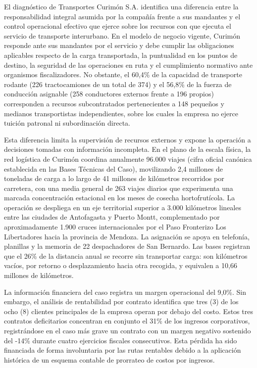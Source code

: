 El diagnóstico de Transportes Curimón S.A. identifica una diferencia entre la responsabilidad integral asumida por la compañía frente a sus mandantes y el control operacional efectivo que ejerce sobre los recursos con que ejecuta el servicio de transporte interurbano. En el modelo de negocio vigente, Curimón responde ante sus mandantes por el servicio y debe cumplir las obligaciones aplicables respecto de la carga transportada, la puntualidad en los puntos de destino, la seguridad de las operaciones en ruta y el cumplimiento normativo ante organismos fiscalizadores. No obstante, el 60,4\% de la capacidad de transporte rodante (226 tractocamiones de un total de 374) y el 56,8\% de la fuerza de conducción asignable (258 conductores externos frente a 196 propios) corresponden a recursos subcontratados pertenecientes a 148 pequeños y medianos transportistas independientes, sobre los cuales la empresa no ejerce tuición patronal ni subordinación directa.

Esta diferencia limita la supervisión de recursos externos y expone la operación a decisiones tomadas con información incompleta. En el plano de la escala física, la red logística de Curimón coordina anualmente 96.000 viajes (cifra oficial canónica establecida en las Bases Técnicas del Caso), movilizando 2,4 millones de toneladas de carga a lo largo de 41 millones de kilómetros recorridos por carretera, con una media general de 263 viajes diarios que experimenta una marcada concentración estacional en los meses de cosecha hortofrutícola. La operación se despliega en un eje territorial superior a 3.000 kilómetros lineales entre las ciudades de Antofagasta y Puerto Montt, complementado por aproximadamente 1.900 cruces internacionales por el Paso Fronterizo Los Libertadores hacia la provincia de Mendoza. La asignación se apoya en telefonía, planillas y la memoria de 22 despachadores de San Bernardo. Las bases registran que el 26\% de la distancia anual se recorre sin transportar carga: son kilómetros vacíos, por retorno o desplazamiento hacia otra recogida, y equivalen a 10,66 millones de kilómetros.

La información financiera del caso registra un margen operacional del 9,0\%. Sin embargo, el análisis de rentabilidad por contrato identifica que tres (3) de los ocho (8) clientes principales de la empresa operan por debajo del costo. Estos tres contratos deficitarios concentran en conjunto el 31\% de los ingresos corporativos, registrándose en el caso más grave un contrato con un margen negativo sostenido del -14\% durante cuatro ejercicios fiscales consecutivos. Esta pérdida ha sido financiada de forma involuntaria por las rutas rentables debido a la aplicación histórica de un esquema contable de prorrateo de costos por ingresos.

